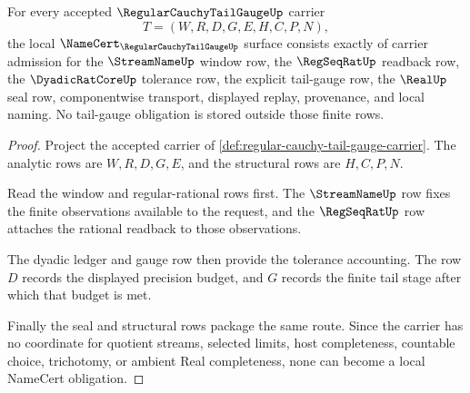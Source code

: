 \begin{theorem}
\label{thm:regular-cauchy-tail-gauge-namecert-obligations}
For every accepted $\RegularCauchyTailGaugeUp$ carrier
$$
T=(W,R,D,G,E,H,C,P,N),
$$
the local $\NameCert_{\RegularCauchyTailGaugeUp}$ surface consists exactly of carrier admission for the $\StreamNameUp$ window row, the $\RegSeqRatUp$ readback row, the $\DyadicRatCoreUp$ tolerance row, the explicit tail-gauge row, the $\RealUp$ seal row, componentwise transport, displayed replay, provenance, and local naming. No tail-gauge obligation is stored outside those finite rows.
\end{theorem}
\begin{proof}
Project the accepted carrier of \autoref{def:regular-cauchy-tail-gauge-carrier}. The analytic rows are $W,R,D,G,E$, and the structural rows are $H,C,P,N$.

Read the window and regular-rational rows first. The $\StreamNameUp$ row fixes the finite observations available to the request, and the $\RegSeqRatUp$ row attaches the rational readback to those observations.

The dyadic ledger and gauge row then provide the tolerance accounting. The row $D$ records the displayed precision budget, and $G$ records the finite tail stage after which that budget is met.

Finally the seal and structural rows package the same route. Since the carrier has no coordinate for quotient streams, selected limits, host completeness, countable choice, trichotomy, or ambient Real completeness, none can become a local NameCert obligation.
\end{proof}

